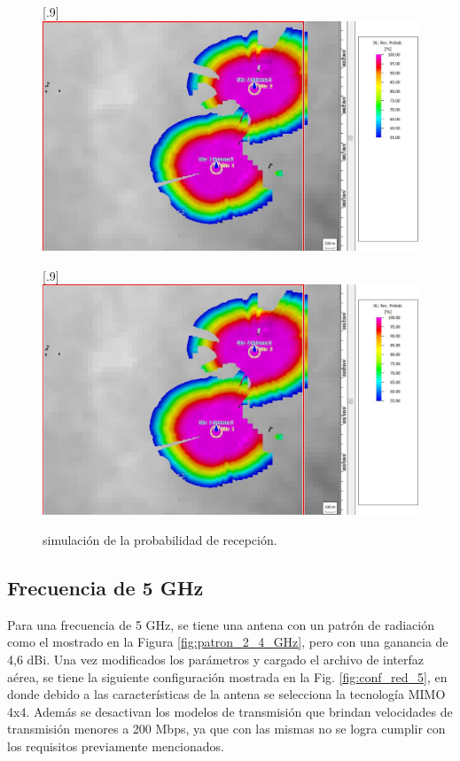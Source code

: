 \documentclass[11pt,a4paper]{article}
\begin{document}
\begin{figure}[ht!]
  \centering
  [.9\linewidth]{\includegraphics[height=14\baselineskip]{fotos_ema/dl_prob_rec_2_4.jpg}}

  [.9\linewidth]{\includegraphics[height=14\baselineskip]{fotos_ema/ul_prob_rec_2_4.jpg}}
  \caption{simulación de la probabilidad de recepción.}
  \label{fig:prob_rec_2_4}
\end{figure}

\clearpage
\subsection{Frecuencia de 5 GHz}

Para una frecuencia de 5 GHz, se tiene una antena con un patrón de radiación como el mostrado en la Figura \ref{fig:patron_2_4_GHz}, pero con una ganancia de 4,6 dBi. 
Una vez modificados los parámetros y cargado el archivo de interfaz aérea, se tiene la siguiente configuración mostrada en la Fig. \ref{fig:conf_red_5}, en donde debido a las características de la antena se selecciona la tecnología MIMO 4x4. 
Además se desactivan los modelos de transmisión que brindan velocidades de transmisión menores a 200 Mbps, ya que con las mismas no se logra cumplir con los requisitos previamente mencionados.
\end{document}
